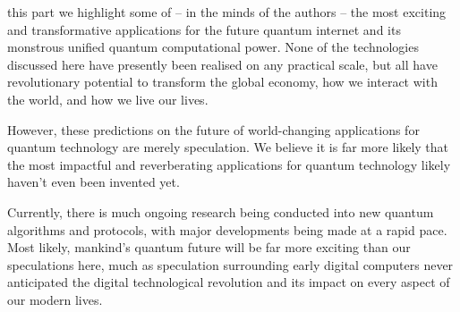 %
%

 this part we highlight some of -- in the minds of the authors -- the most exciting and transformative applications for the future quantum internet and its monstrous unified quantum computational power. None of the technologies discussed here have presently been realised on any practical scale, but all have revolutionary potential to transform the global economy, how we interact with the world, and how we live our lives.

However, these predictions on the future of world-changing applications for quantum technology are merely speculation. We believe it is far more likely that the most impactful and reverberating applications for quantum technology likely haven't even been invented yet.

Currently, there is much ongoing research being conducted into new quantum algorithms and protocols, with major developments being made at a rapid pace. Most likely, mankind's quantum future will be far more exciting than our speculations here, much as speculation surrounding early digital computers never anticipated the digital technological revolution and its impact on every aspect of our modern lives.